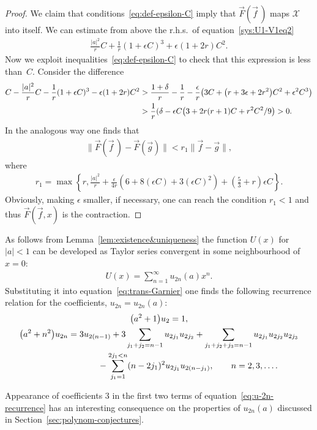 \documentclass[pdftex]{sigma}
\numberwithin{equation}{section}
\begin{document}
\begin{proof}
We claim that conditions~\eqref{eq:def-epsilon-C} imply that $\vec{F}(\vec{f}\,)$ maps $\mathcal{X}$
into itself. We can estimate from above the r.h.s.\ of equation~\eqref{sys:U1-V1eq2}
\begin{gather*}
\frac{|a|^2}{r}C+\frac1{r}(1+\epsilon C)^3+\epsilon(1+2r)C^2.
\end{gather*}
Now we exploit inequalities~\eqref{eq:def-epsilon-C} to check that this expression is less than~$C$. Consider the difference
\begin{gather*}\begin{split}&
C-\frac{|a|^2}{r}C-\frac1{r}(1+\epsilon C)^3-\epsilon(1+2r)C^2 >\frac{1+\delta}r-\frac1r -\frac{\epsilon}{r}\big(3C+\big(r+3\epsilon+2r^2\big)C^2+\epsilon^2C^3\big)\\
&\hphantom{C-\frac{|a|^2}{r}C-\frac1{r}(1+\epsilon C)^3-\epsilon(1+2r)C^2}{} >\frac1r(\delta-\epsilon C\big(3+2r(r+1)C+r^2C^2/9\big)>0.\end{split}
\end{gather*}
In the analogous way one finds that
\begin{gather*}
\|\vec{F}(\vec{f}\,)-\vec{F}(\vec{g})\|<r_1\|\vec{f}-\vec{g}\|,
\end{gather*}
where
\begin{gather*}
r_1=\max\left\{r,\frac{|a|^2}{r}+\frac{\epsilon}{4r}\left(6+8(\epsilon C)+3(\epsilon C)^2\right)
+\left(\frac53+r\right)\epsilon C \right\}.
\end{gather*}
Obviously, making $\epsilon$ smaller, if necessary, one can reach the condition $r_1<1$ and thus $\vec{F}(\vec{f},x)$
is the contraction.
\end{proof}

As follows from Lemma~\ref{lem:existence&uniqueness} the function $U(x)$ for $|a|<1$ can be developed as
Taylor series convergent in some neighbourhood of $x=0$:
\begin{gather}\label{eq:U-series}
U(x)=\sum\limits_{n=1}^{\infty}u_{2n}(a)x^n.
\end{gather}
Substituting it into equation~\eqref{eq:trans-Garnier} one finds the following recurrence relation for the coefficients, $u_{2n}=u_{2n}(a)$:
\begin{gather}
\big(a^2+1\big)u_{2} =1,\label{eq:u-2}\\
\big(a^2+n^2\big)u_{2n} =3u_{2(n-1)}+3\sum\limits_{j_1+j_2=n-1}u_{2j_1}u_{2j_2} +\sum\limits_{j_1+j_2+j_3=n-1}u_{2j_1}u_{2j_2}u_{2j_3}\nonumber\\
\hphantom{\big(a^2+n^2\big)u_{2n} =}{} -\sum\limits_{j_1=1}^{2j_1<n}(n-2j_1)^2u_{2j_1}u_{2(n-j_1)},\qquad n=2,3,\ldots.\label{eq:u-2n-recurrence}
\end{gather}
\begin{Remark}\label{rem:coeff3}
Appearance of coefficients $3$ in the first two terms of equation~\eqref{eq:u-2n-recurrence} has an interesting
consequence on the properties of $u_{2n}(a)$ discussed in Section~\ref{sec:polynom-conjectures}.
\end{Remark}
\end{document}
